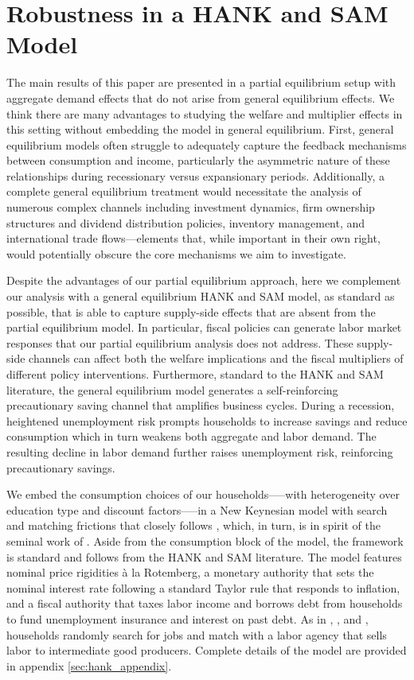 \documentclass[\econtexRoot/HAFiscal]{subfiles}
\begin{document}
	
\FloatBarrier
\hypertarget{hank}{}\par\section{Robustness in a HANK and SAM Model}
\notinsubfile{\label{sec:hank}}


The main results of this paper are presented in a partial equilibrium setup with aggregate demand effects that do not arise from general equilibrium effects. We think there are many advantages to studying the welfare and multiplier effects in this setting without embedding the model in general equilibrium.  First, general equilibrium models often struggle to adequately capture the feedback mechanisms between consumption and income, particularly the asymmetric nature of these relationships during recessionary versus expansionary periods. Additionally, a complete general equilibrium treatment would necessitate the analysis of numerous complex channels including investment dynamics, firm ownership structures and dividend distribution policies, inventory management, and international trade flows—elements that, while important in their own right, would potentially obscure the core mechanisms we aim to investigate.

Despite the advantages of our partial equilibrium approach, here we complement our analysis with a general equilibrium HANK and SAM model, as standard as possible, that is able to capture supply-side effects that are absent from the partial equilibrium model. In particular, fiscal policies can generate labor market responses that our partial equilibrium analysis does not address. These supply-side channels can affect both the welfare implications and the fiscal multipliers of different policy interventions. Furthermore, standard to the HANK and SAM literature, the general equilibrium model generates a self-reinforcing precautionary saving channel that amplifies business cycles. During a recession, heightened unemployment risk prompts households to increase savings and reduce consumption which in turn weakens both aggregate and labor demand. The resulting decline in labor demand further raises unemployment risk, reinforcing precautionary savings.

We embed the consumption choices of our households—--with heterogeneity over education type and discount factors—--in a New Keynesian model with search and matching frictions that closely follows \cite{Du2024}, which, in turn, is in spirit of the seminal work of \cite{Ravn2017}. Aside from the consumption block of the model, the framework is standard and follows from the HANK and SAM literature. The model features nominal price rigidities \`{a} la Rotemberg, a monetary authority that sets the nominal interest rate following a standard Taylor rule that responds to inflation, and a fiscal authority that taxes labor income and borrows debt from households to fund unemployment insurance and interest on past debt. As in \cite{Gornemann2021}, \cite{Bardoczy2022}, and \cite{gravesUnemployment}, households randomly search for jobs and match with a labor agency that sells labor to intermediate good producers. Complete details of the model are provided in appendix \ref{sec:hank_appendix}. 
\end{document}
